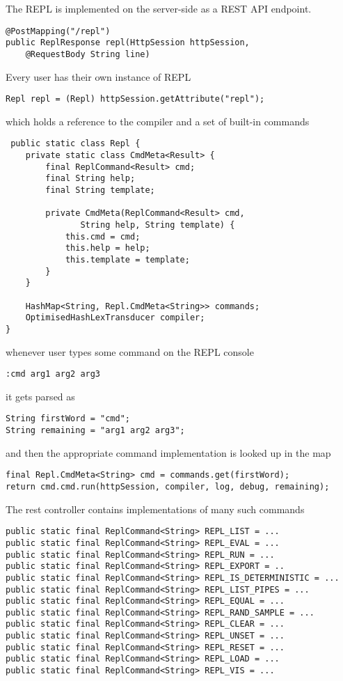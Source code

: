 The REPL is implemented on the server-side as a REST API endpoint. 
\begin{lstlisting}
@PostMapping("/repl")
public ReplResponse repl(HttpSession httpSession, 
    @RequestBody String line)
\end{lstlisting}
Every user has their own instance of REPL
\begin{lstlisting}
Repl repl = (Repl) httpSession.getAttribute("repl");
\end{lstlisting}
which holds a reference to the compiler and a set of built-in commands
\begin{lstlisting}
 public static class Repl {
    private static class CmdMeta<Result> {
        final ReplCommand<Result> cmd;
        final String help;
        final String template;
        
        private CmdMeta(ReplCommand<Result> cmd, 
               String help, String template) {
            this.cmd = cmd;
            this.help = help;
            this.template = template;
        }
    }
	
    HashMap<String, Repl.CmdMeta<String>> commands;
    OptimisedHashLexTransducer compiler;
}
\end{lstlisting}
whenever user types some command on the REPL console
\begin{lstlisting}
:cmd arg1 arg2 arg3
\end{lstlisting}
it gets parsed as
\begin{lstlisting}
String firstWord = "cmd";
String remaining = "arg1 arg2 arg3";
\end{lstlisting}
and then the appropriate command implementation is looked up in the map
\begin{lstlisting}
final Repl.CmdMeta<String> cmd = commands.get(firstWord);
return cmd.cmd.run(httpSession, compiler, log, debug, remaining);
\end{lstlisting}
The rest controller contains implementations of many such commands
\begin{lstlisting}
public static final ReplCommand<String> REPL_LIST = ...
public static final ReplCommand<String> REPL_EVAL = ...
public static final ReplCommand<String> REPL_RUN = ...
public static final ReplCommand<String> REPL_EXPORT = ..
public static final ReplCommand<String> REPL_IS_DETERMINISTIC = ...
public static final ReplCommand<String> REPL_LIST_PIPES = ...
public static final ReplCommand<String> REPL_EQUAL = ...
public static final ReplCommand<String> REPL_RAND_SAMPLE = ...
public static final ReplCommand<String> REPL_CLEAR = ...
public static final ReplCommand<String> REPL_UNSET = ...
public static final ReplCommand<String> REPL_RESET = ...
public static final ReplCommand<String> REPL_LOAD = ...
public static final ReplCommand<String> REPL_VIS = ...
\end{lstlisting}
